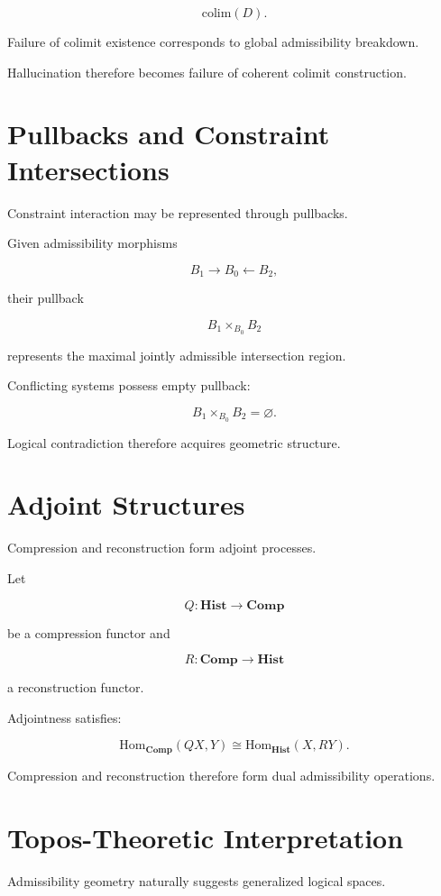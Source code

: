 \documentclass[12pt,openany]{book}
\theoremstyle{plain}
\theoremstyle{definition}
\theoremstyle{remark}
\begin{document}
\[
\mathrm{colim}(D).
\]

Failure of colimit existence corresponds to global admissibility
breakdown.

Hallucination therefore becomes failure of coherent colimit
construction.

\section{Pullbacks and Constraint Intersections}

Constraint interaction may be represented through pullbacks.

Given admissibility morphisms

\[
B_1 \to B_0
\leftarrow B_2,
\]

their pullback

\[
B_1\times_{B_0}B_2
\]

represents the maximal jointly admissible intersection region.

Conflicting systems possess empty pullback:

\[
B_1\times_{B_0}B_2
=
\varnothing.
\]

Logical contradiction therefore acquires geometric structure.

\section{Adjoint Structures}

Compression and reconstruction form adjoint processes.

Let

\[
Q :
\mathbf{Hist}
\to
\mathbf{Comp}
\]

be a compression functor and

\[
R :
\mathbf{Comp}
\to
\mathbf{Hist}
\]

a reconstruction functor.

Adjointness satisfies:

\[
\mathrm{Hom}_{\mathbf{Comp}}(QX,Y)
\cong
\mathrm{Hom}_{\mathbf{Hist}}(X,RY).
\]

Compression and reconstruction therefore form dual admissibility
operations.

\section{Topos-Theoretic Interpretation}

Admissibility geometry naturally suggests generalized logical
spaces.
\end{document}
